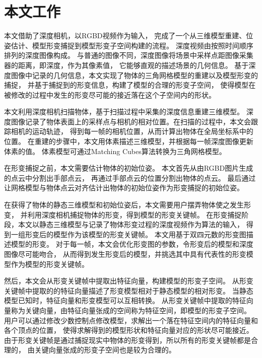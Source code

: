 
\section{本文工作}
本文借助了深度相机，以RGBD视频作为输入，
完成了一个从三维模型重建、位姿估计、模型形变捕捉到模型形变子空间构建的流程。
深度视频由按照时间顺序排列的深度图像构成。
与普通的图像不同，深度图像将场景中采样点距图像采集器的距离，即深度，作为其像素值，
它能够直观的描述场景的几何信息。
基于深度图像中记录的几何信息，本文实现了物体的三角网格模型的重建以及模型形变的捕捉，
并基于捕捉到的形变信息，构建了模型的合理的形变子空间，
使得模型在被修改的过程中发生的形变尽可能的接近落在这个子空间内的形状。

本文利用深度相机扫描物体，基于扫描过程中采集的深度信息重建三维模型。
深度图像记录了物体表面上的采样点与相机的相对位置。在扫描的过程中，本文会跟踪相机的运动轨迹，
得到每一帧的相机位置，从而计算出物体在全局坐标系中的位置。
在重建的步骤中，本文用体素描述三维模型，并根据每一帧深度图像更新体素的值。
体素模型可通过Matching Cubes\cite{lorensen1987marching}算法转换为三角网格模型。

在形变捕捉之前，本文需要估计物体的初始位姿。
本文首先从由RGBD图片生成的点云中分割出手部点云，
再通过手部点云的位置分割出物体的点云。
最后通过让网格模型与物体点云对齐估计出物体的初始位姿作为形变捕捉的初始位姿。

在获得了物体的静态三维模型和初始位姿后，本文需要用户摆弄物体使之发生形变，
并利用深度相机捕捉物体的形变，得到模型的形变关键帧。
在形变捕捉阶段，本文以静态三维模型与记录了物体形变过程的深度视频作为算法的输入，
得到一组形变后的模型作为该模型的形变关键帧。
本文用基于双四元数的形变图描述模型的形变。
对于每一帧，本文会优化形变图的参数，令形变后的模型和深度图像尽可能吻合，
从而得到发生形变后的模型，并挑选其中具有代表性的形变模型作为模型的形变关键帧。

然后，本文会从形变关键帧中提取出特征向量，构建模型的形变子空间。
从形变关键帧中提取的的特征向量描述了形变模型相对于静态模型的相对形变。
当静态模型已知时，特征向量和形变模型可以互相转换。
从形变关键帧中提取的特征向量称为关键向量，由特征向量张成的空间称为特征空间，即模型的形变子空间。
用户可以通过修改少数控制点修改模型，求解出一个落在特征空间内的特征向量和各个顶点的位置，
使得求解得到的模型形状和特征向量对应的形状尽可能接近。
由于形变关键帧是通过捕捉现实中物体的形变得到，所以所有的形变关键帧都是合理的，
由关键向量张成的形变子空间也是较为合理的。

